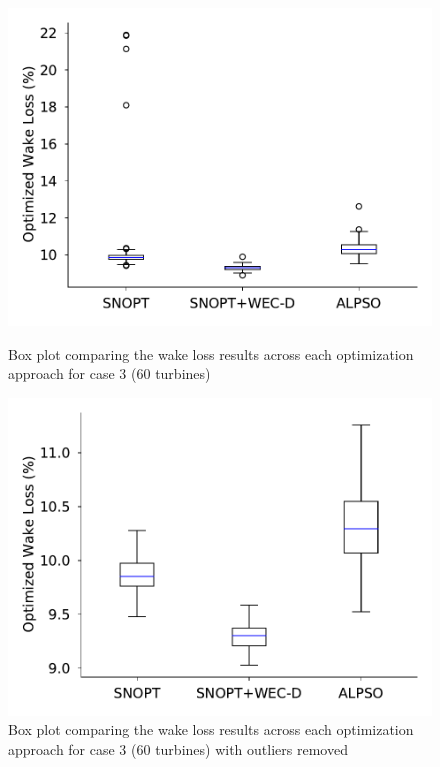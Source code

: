 \documentclass[a4paper]{jpconf}
\begin{document}
\begin{figure}[h!]  
	\centering
	\begin{minipage}[t]{18pc}    
		\centering
		\includegraphics[width=\textwidth, trim={0cm 0cm 0cm 0cm}]{final_images/results/60turbs_results_alpso_percent_wake_loss.pdf}
		\caption{Box plot comparing the wake loss results across each optimization approach for case 3 (60 turbines)}
		\label{fig:60-wake-loss}
	\end{minipage}\hspace{1pc}
	\begin{minipage}[t]{18pc}    
		\centering
		\includegraphics[width=\textwidth, trim={0cm 0cm 0cm 0cm}]{final_images/results/60turbs_results_alpso_percent_wake_loss_zoom.pdf}
		\caption{Box plot comparing the wake loss results across each optimization approach for case 3 (60 turbines) with outliers removed}
		\label{fig:60-wake-loss-no-outliers}
	\end{minipage}
\end{figure}
\end{document}

